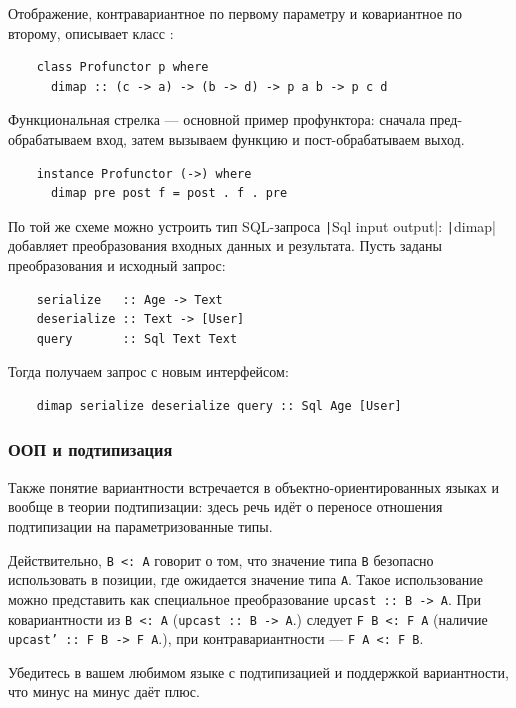 Отображение, контравариантное по первому параметру и ковариантное по второму, описывает класс :
\begin{verbatim}
    class Profunctor p where
      dimap :: (c -> a) -> (b -> d) -> p a b -> p c d
\end{verbatim}

Функциональная стрелка --- основной пример профунктора: сначала пред-обрабатываем вход, затем вызываем функцию и пост-обрабатываем выход.
\begin{verbatim}
    instance Profunctor (->) where
      dimap pre post f = post . f . pre
\end{verbatim}
По той же схеме можно устроить тип SQL-запроса \texttt|Sql input output|: \texttt|dimap| добавляет преобразования входных данных и результата.
Пусть заданы преобразования и исходный запрос:
\begin{verbatim}
    serialize   :: Age -> Text
    deserialize :: Text -> [User]
    query       :: Sql Text Text
\end{verbatim}
Тогда получаем запрос с новым интерфейсом:
\begin{verbatim}
    dimap serialize deserialize query :: Sql Age [User]
\end{verbatim}

\subsubsection{ООП и подтипизация}


Также понятие вариантности встречается в объектно-ориентированных языках и вообще в теории подтипизации: здесь речь идёт о переносе отношения подтипизации на параметризованные типы.

Действительно,  \texttt{B <: A} говорит о том, что значение типа \texttt{B} безопасно использовать в позиции, где ожидается значение типа \texttt{A}.
Такое использование можно представить как специальное преобразование \texttt{upcast :: B -> A}.
При ковариантности из \texttt{B <: A} (\texttt{upcast :: B -> A}.) следует \texttt{F B <: F A} (наличие \texttt{upcast' :: F B -> F A}.), при контравариантности --- \texttt{F A <: F B}.

\begin{task}
    Убедитесь в вашем любимом языке с подтипизацией и поддержкой вариантности, что минус на минус даёт плюс.
\end{task}

